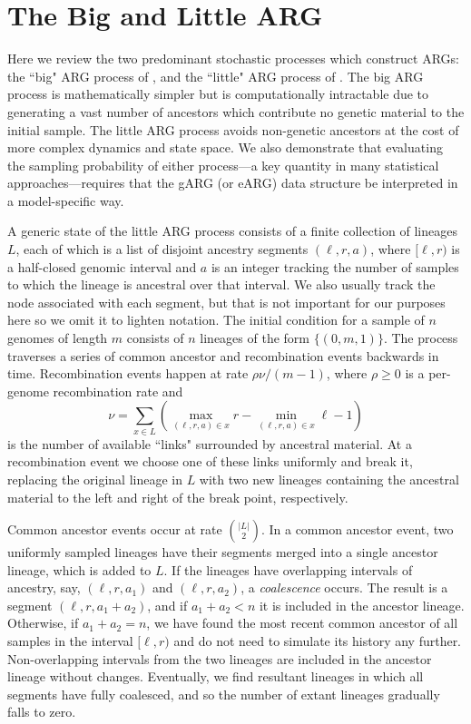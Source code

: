 \documentclass{article}
\begin{document}
\section{The Big and Little ARG}
\label{app-big-and-little-arg}
Here we review the two predominant stochastic processes which construct ARGs:
the ``big" ARG process of \cite{griffiths1997ancestral}, and the ``little" ARG process of
 \cite{hudson1983properties}. The big ARG process is mathematically simpler
 but is computationally intractable due to generating a vast number of ancestors
 which contribute no genetic material to the initial sample.
The little ARG process avoids non-genetic ancestors at the cost of more complex
dynamics and state space. We also demonstrate that evaluating the sampling probability
of either process---a key quantity in many statistical approaches---requires that the
gARG (or eARG) data structure be interpreted in a model-specific way.

A generic state of the little ARG process consists of a finite collection of lineages $L$,
each of which is a list of disjoint ancestry segments $(\ell, r, a)$, where
$[\ell, r)$ is a half-closed genomic interval and $a$ is an integer
tracking the number of samples to which the lineage is ancestral over that interval.
We also usually track the node associated with each segment, but
that is not important for our purposes here so we omit it to lighten notation.
The initial condition for a sample of $n$ genomes of length $m$ consists of $n$ lineages
of the form $\{(0, m, 1)\}$. The process traverses a series of common ancestor and
recombination events backwards in time.
Recombination events happen at rate $\rho \nu / (m - 1)$,
where $\rho \geq 0$ is a per-genome recombination rate and
 \[
 \nu = \sum_{x \in L}\left( \max_{(\ell, r, a) \in x}r
     - \min_{(\ell, r, a) \in x}\ell - 1 \right)
 \]
 is the number of available ``links" surrounded by ancestral material.
 At a recombination event we choose one of these links uniformly and break it,
 replacing the original lineage in $L$ with two new lineages containing the ancestral material
 to the left and right of the break point, respectively.

Common ancestor events occur at rate $\binom{|L|}{2}$.
In a common ancestor event, two uniformly sampled lineages have their segments
merged into a single ancestor lineage, which is added to $L$.
If the lineages have overlapping intervals of ancestry,
say, $(\ell, r, a_1)$ and $(\ell, r, a_2)$, a
\emph{coalescence} occurs. The result is a segment
$(\ell, r, a_1 + a_2)$, and if $a_1 + a_2 < n$ it is included in the
ancestor lineage. Otherwise, if $a_1 + a_2 = n$, we have found
the most recent common ancestor of all samples in the interval $[\ell, r)$
and do not need to simulate its history any further.
Non-overlapping intervals from the two lineages are included
 in the ancestor lineage without changes. Eventually,
we find resultant lineages in which all segments have fully coalesced,
and so the number of extant lineages gradually falls to zero.
\end{document}
